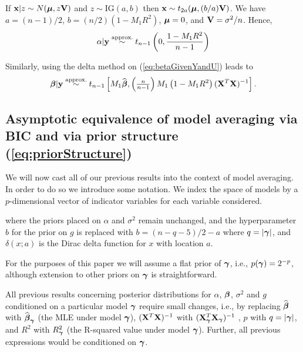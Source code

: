 \documentclass{article}[12pt]
\begin{document}
If ${\bf x}|z \sim N({\boldsymbol \mu},z{\bf V})$ and $z\sim \mbox{IG}(a,b)$ then
${\bf x} \sim t_{2a}( {\boldsymbol \mu}, (b/a){\bf V})$. 
We have $a = (n - 1)/2$, $b = (n/2)\left( 1 - M_1 R^2\right)$, ${\boldsymbol \mu} = 0$, and ${\bf V} = \sigma^2/n$. Hence,
$$
\alpha|{\bf y} \stackrel{\mbox{\scriptsize approx.}}{\sim} t_{n-1}\left( 0, \frac{1 - M_1 R^2}{n-1} \right)
$$

Similarly, using the delta method on (\ref{eq:betaGivenYandU}) leads to
\begin{equation}\label{eq:betaGivenYandU}
\displaystyle {\boldsymbol\beta}|{\bf y} \stackrel{\mbox{\scriptsize approx.}}{\sim} t_{n-1}\left[
M_1 \widehat{{\boldsymbol \beta}},
\left(\tfrac{n}{n-1}\right) M_1  \left( 1 - M_1  R^2\right) ({\bf X}^T{\bf X})^{-1}
\right].
\end{equation}

 




 
\subsection{Asymptotic equivalence of model averaging via BIC and via prior structure (\ref{eq:priorStructure})}


\noindent We will now cast all of our previous results into the context of model averaging.
In order to do so we introduce some notation.
We index the space of models by a $p$-dimensional vector of indicator variables for each variable considered. 


\noindent where the priors placed on $\alpha$ and $\sigma^2$ remain unchanged, and
the hyperparameter $b$ for the prior on $g$ is replaced with $b=(n - q - 5)/2 - a$
where $q = |{\boldsymbol \gamma}|$, and $\delta(x;a)$ is the Dirac delta function for $x$ with
location $a$. 

For the purposes of this paper we will assume a flat prior of ${\boldsymbol \gamma}$, i.e., 
$p({\boldsymbol \gamma}) = 2^{-p}$, although extension to other priors on ${\boldsymbol \gamma}$ is
straightforward.

All previous results concerning posterior distributions for $\alpha$, ${\boldsymbol \beta}$, $\sigma^2$ and $g$ conditioned on a particular model ${\boldsymbol \gamma}$ require small changes, i.e.,
by replacing $\widehat{{\boldsymbol \beta}}$ with $\widehat{{\boldsymbol \beta}}_{\boldsymbol \gamma}$ (the MLE under model
${\boldsymbol \gamma}$), $({\bf X}^T{\bf X})^{-1}$ with $({\bf X}_{\boldsymbol \gamma}^T{\bf X}_{\boldsymbol \gamma})^{-1}$ , $p$ with $q = |{\boldsymbol \gamma}|$, and $R^2$ with $R_{\boldsymbol \gamma}^2$ (the R-squared value
under model ${\boldsymbol \gamma}$). Further, all previous expressions would be conditioned on
${\boldsymbol \gamma}$.
\end{document}
